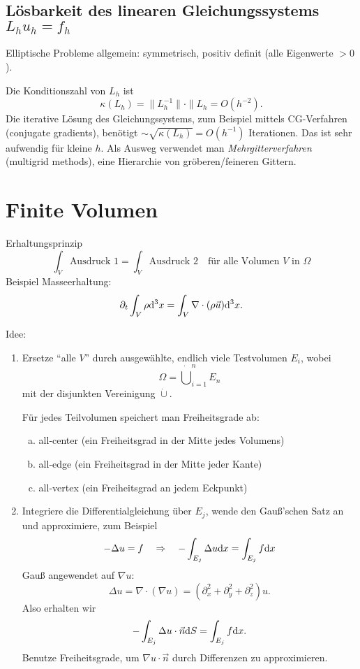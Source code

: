\subsection{Lösbarkeit des linearen Gleichungssystems
  $L_h u_h = f_h$}

Elliptische Probleme allgemein: symmetrisch, positiv definit (alle Eigenwerte
$>0$).

Die Konditionszahl von $L_h$ ist
\[ \kappa(L_h) = \| L_h^{-1} \| \cdot \| L_h = O(h^{-2}). \]
Die iterative Lösung des Gleichungssystems, zum Beispiel mittels CG-Verfahren
(conjugate gradients), benötigt $\sim \sqrt{\kappa(L_h)} = O(h^{-1})$
Iterationen. Das ist sehr aufwendig für kleine $h$. Als Ausweg verwendet man
\emph{Mehrgitterverfahren} (multigrid methods), eine Hierarchie von
gröberen/feineren Gittern.

\section{Finite Volumen} %
Erhaltungsprinzip
\[ \int_V \text{Ausdruck 1} = \int_V \text{Ausdruck 2} \quad
  \text{für alle Volumen $V$ in $\Omega$} \]
Beispiel Masseerhaltung:
\[ \partial_t \int_V \rho \mathrm{d}^3 x = \int_V \nabla \cdot (\rho \vec{u})
  \mathrm{d}^3 x. \]

Idee:
\begin{enumerate}
\item Ersetze ``alle $V$'' durch ausgewählte, endlich viele Testvolumen $E_i$,
  wobei
  \[ \Omega = \dot\bigcup_{i=1}^n E_n \]
  mit der disjunkten Vereinigung $\dot\cup$.

  Für jedes Teilvolumen speichert man Freiheitsgrade ab:
  \begin{enumerate}[(a)]
  \item all-center (ein Freiheitsgrad in der Mitte jedes Volumens)
  \item all-edge (ein Freiheitsgrad in der Mitte jeder Kante)
  \item all-vertex (ein Freiheitsgrad an jedem Eckpunkt)
  \end{enumerate}
\item Integriere die Differentialgleichung über $E_j$, wende den Gauß'schen Satz
  an  und approximiere, zum Beispiel
  \[ - \Delta u = f \quad \Rightarrow \quad
    - \int_{E_j} \Delta u \mathrm{d} x = \int_{E_j} f \mathrm{d} x \]
  Gauß angewendet auf $\nabla u$:
  \[ \Delta u = \nabla \cdot( \nabla u ) = ( \partial_x^2 + \partial_y^2 +
    \partial_z^2) u. \]
  Also erhalten wir
  \[ - \int_{E_j} \Delta u \cdot \vec{n} \mathrm{d} S =
    \int_{E_j} f \mathrm{d} x. \]
  Benutze Freiheitsgrade, um $\nabla u \cdot \vec{n}$ durch Differenzen zu
  approximieren. 
\end{enumerate}

